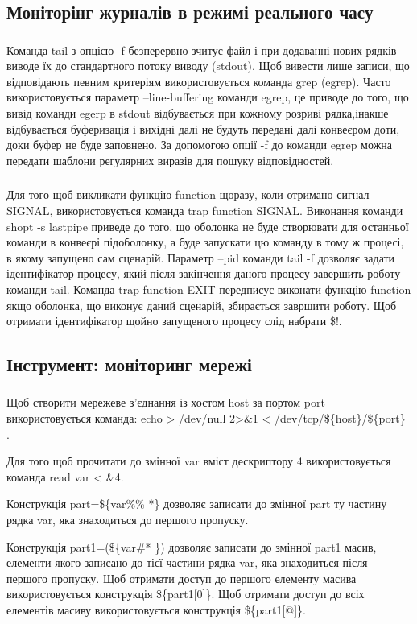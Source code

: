 \documentclass[t]{beamer}  %
\begin{document}
\subsection{Моніторінг журналів в режимі реального часу}

\begin{frame}
	\frametitle{\insertsection} 
	\framesubtitle{\insertsubsection}
Команда tail з опцією -f безперервно зчитує файл і при додаванні нових рядків виводе їх до стандартного потоку виводу (stdout). Щоб вивести лише записи, що відповідають певним критеріям використовується команда grep (egrep). Часто використовується параметр --line-buffering команди egrep, це приводе до того, що вивід команди egerp в stdout відбувається при кожному розриві рядка,інакше відбувається буферизація і вихідні далі не будуть передані далі конвеєром доти, доки буфер не буде заповнено. За допомогою опції -f до команди egrep можна передати шаблони регулярних виразів для пошуку відповідностей.
\end{frame}

\begin{frame}
	\frametitle{\insertsection} 
	\framesubtitle{\insertsubsection}
Для того щоб викликати функцію function щоразу, коли отримано сигнал SIGNAL, використовується команда trap function SIGNAL. Виконання команди shopt -s lastpipe приведе до того, що оболонка не буде створювати для останньої команди в конвеєрі підоболонку, а буде запускати цю команду в тому ж процесі, в якому запущено сам сценарій. Параметр --pid команди tail -f дозволяє задати ідентифікатор процесу, який після закінчення даного процесу завершить роботу команди tail. Команда trap function EXIT передписує виконати функцію function якщо оболонка, що виконує даний сценарій, збирається завршити роботу. Щоб отримати ідентифікатор щойно запущеного процесу слід набрати \$!.
\end{frame}

\subsection{Інструмент: моніторинг мережі}
\begin{frame}
 	\frametitle{\insertsection} 
 	\framesubtitle{\insertsubsection}
Щоб створити мережеве з'єднання із хостом host за портом port використовується команда: echo > /dev/null 2>\&1 < /dev/tcp/\$\{host\}/\$\{port\} .

Для того щоб прочитати до змінної var вміст дескриптору 4 використовується команда read var < \&4.

Конструкція part=\$\{var\%\% *\} дозволяє записати до змінної part ту частину рядка var, яка знаходиться до першого пропуску.

Конструкція part1=(\$\{var\#* \}) дозволяє записати до змінної part1 масив, елементи якого записано до тієї частини рядка var, яка знаходиться після першого пропуску. Щоб отримати доступ до першого елементу масива використовується конструкція \$\{part1[0]\}. Щоб отримати доступ до всіх елементів масиву використовується конструкція \$\{part1[@]\}.
 \end{frame}
 
\end{document}
